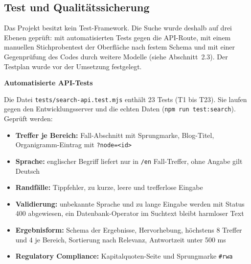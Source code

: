 \documentclass[11pt,a4paper]{article}
\newcommand{\minihead}[1]{\par\needspace{5\baselineskip}\noindent\textbf{#1}\par\nobreak}
\let\oldsubsection\subsection
\renewcommand{\subsection}{\needspace{6\baselineskip}\oldsubsection}
\begin{document}
\subsection{Test und Qualitätssicherung}
Das Projekt besitzt kein Test-Framework. Die Suche wurde deshalb auf drei Ebenen geprüft: mit automatisierten Tests gegen die API-Route, mit einem manuellen Stichprobentest der Oberfläche nach festem Schema und mit einer Gegenprüfung des Codes durch weitere Modelle (siehe Abschnitt~2.3). Der Testplan wurde vor der Umsetzung festgelegt.

\minihead{Automatisierte API-Tests}
Die Datei \texttt{tests/search-api.test.mjs} enthält 23 Tests (T1 bis T23). Sie laufen gegen den Entwicklungsserver und die echten Daten (\texttt{npm run test:search}). Geprüft werden:
\begin{itemize}[nosep]
  \item \textbf{Treffer je Bereich:} Fall-Abschnitt mit Sprungmarke, Blog-Titel, Organigramm-Eintrag mit \texttt{?node=<id>}
  \item \textbf{Sprache:} englischer Begriff liefert nur in \texttt{/en} Fall-Treffer, ohne Angabe gilt Deutsch
  \item \textbf{Randfälle:} Tippfehler, zu kurze, leere und trefferlose Eingabe
  \item \textbf{Validierung:} unbekannte Sprache und zu lange Eingabe werden mit Status 400 abgewiesen, ein Datenbank-Operator im Suchtext bleibt harmloser Text
  \item \textbf{Ergebnisform:} Schema der Ergebnisse, Hervorhebung, höchstens 8 Treffer und 4 je Bereich, Sortierung nach Relevanz, Antwortzeit unter 500 ms
  \item \textbf{Regulatory Compliance:} Kapitalquoten-Seite und Sprungmarke \texttt{\#rwa}
\end{itemize}
\end{document}
